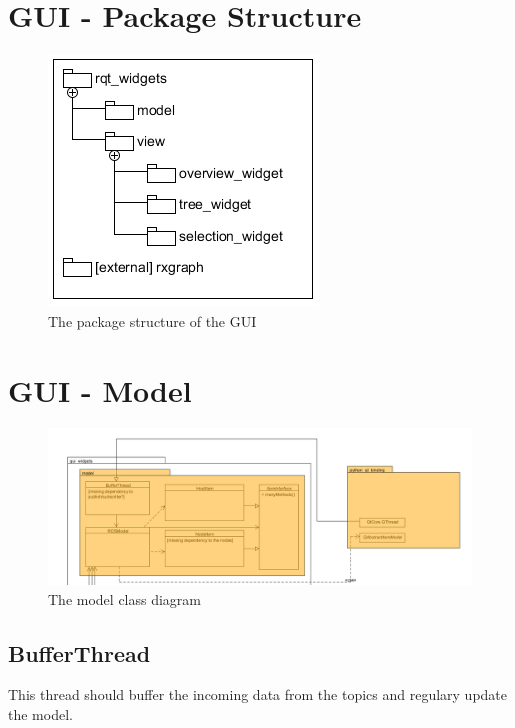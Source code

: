 \section{GUI - Package Structure}
\begin{figure}[!ht]
\begin{center}
\includegraphics[scale=1.0]{./bilder/package_structure_gui.png}
\caption{The package structure of the GUI}
\label{The package structure of the GUI}
\end{center}
\end{figure}

\mbox{}

\newpage


\section{GUI - Model}
\begin{figure}[!ht]
\begin{center}
\includegraphics[width=1.0\linewidth]{./bilder/model.png}
\caption{The model class diagram}
\end{center}
\end{figure}

\subsection{BufferThread}
This thread should buffer the incoming data from the topics and regulary update the model.
